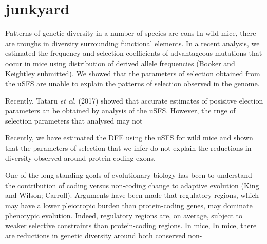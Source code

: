 \documentclass[11pt]{article}
\begin{document}
\section*{junkyard}

Patterns of genetic diversity in a number of species are cons
In wild mice, there are troughs in diversity surrounding functional elements. In a recent analysis, we estimated the frequency and selection coefficients of advantageous mutations that occur in mice using distribution of derived allele frequencies (Booker and Keightley submitted). We showed that the parameters of selection obtained from the uSFS are unable to explain the patterns of selection observed in the genome.

Recently, Tataru \textit{et al.} (2017) showed that accurate estimates of posisitve election parameters an be obtained by analysis of the uSFS. However, the rnge of selection parameters that analysed may not

Recently, we have estimated the DFE using the uSFS for wild mice and shown that the parameters of selection that we infer do not explain the reductions in diversity observed around protein-coding exons. 


One of the long-standing goals of evolutionary biology has been to understand the contribution of coding versus non-coding change to adaptive evolution (King and Wilson; Carroll). Arguments have been made that regulatory regions, which may have a lower pleiotropic burden than protein-coding genes, may dominate phenotypic evolution. Indeed, regulatory regions are, on average,  subject to weaker selective constraints than protein-coding regions. In mice, 
In mice, there are reductions in genetic diversity around both conserved non-
\end{document}
